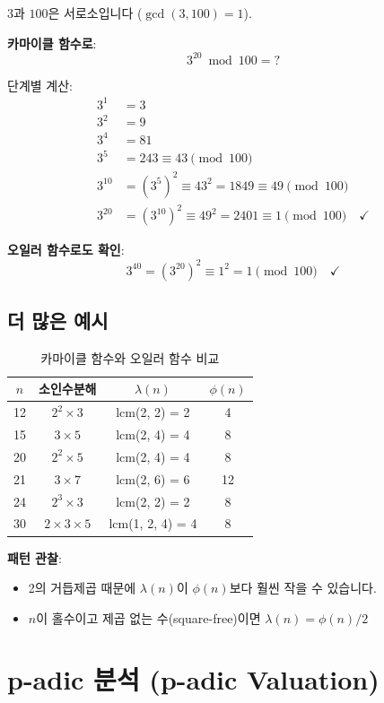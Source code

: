 \documentclass[11pt,a4paper]{article}
\theoremstyle{definition}
\theoremstyle{remark}
\begin{document}
$3$과 $100$은 서로소입니다 ($\gcd(3, 100) = 1$).

\textbf{카마이클 함수로}:
\[3^{20} \bmod 100 = ?\]

단계별 계산:
\begin{align*}
3^1 &= 3 \\
3^2 &= 9 \\
3^4 &= 81 \\
3^5 &= 243 \equiv 43 \pmod{100} \\
3^{10} &= (3^5)^2 \equiv 43^2 = 1849 \equiv 49 \pmod{100} \\
3^{20} &= (3^{10})^2 \equiv 49^2 = 2401 \equiv 1 \pmod{100} \quad \checkmark
\end{align*}

\textbf{오일러 함수로도 확인}:
\[3^{40} = (3^{20})^2 \equiv 1^2 = 1 \pmod{100} \quad \checkmark\]

\subsection{더 많은 예시}

\begin{table}[h]
\centering
\begin{tabular}{cccc}
\toprule
$n$ & 소인수분해 & $\lambda(n)$ & $\phi(n)$ \\
\midrule
12 & $2^2 \times 3$ & lcm(2, 2) = 2 & 4 \\
15 & $3 \times 5$ & lcm(2, 4) = 4 & 8 \\
20 & $2^2 \times 5$ & lcm(2, 4) = 4 & 8 \\
21 & $3 \times 7$ & lcm(2, 6) = 6 & 12 \\
24 & $2^3 \times 3$ & lcm(2, 2) = 2 & 8 \\
30 & $2 \times 3 \times 5$ & lcm(1, 2, 4) = 4 & 8 \\
\bottomrule
\end{tabular}
\caption{카마이클 함수와 오일러 함수 비교}
\end{table}

\textbf{패턴 관찰}:
\begin{itemize}
    \item 2의 거듭제곱 때문에 $\lambda(n)$이 $\phi(n)$보다 훨씬 작을 수 있습니다.
    \item $n$이 홀수이고 제곱 없는 수(square-free)이면 $\lambda(n) = \phi(n)/2$
\end{itemize}

\newpage

\section{p-adic 분석 (p-adic Valuation)}
\end{document}
